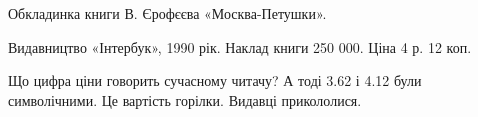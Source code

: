  
 
 
 
 


Обкладинка книги В. Єрофєєва «Москва-Петушки».

Видавництво «Інтербук», 1990 рік. Наклад книги 250 000. Ціна 4 р. 12 коп.

Що цифра ціни говорить сучасному читачу? А тоді 3.62 і 4.12 були символічними.
Це вартість горілки. Видавці прикололися.
